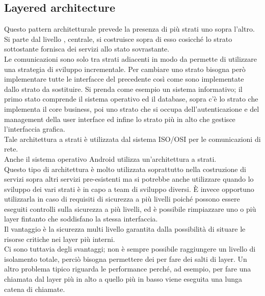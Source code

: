 \subsection{Layered architecture}
Questo pattern architetturale prevede la presenza di più strati uno sopra l'altro.\\
Si parte dal livello , centrale, si costruisce sopra di esso cosicché lo strato sottostante fornisca dei servizi allo stato sovrastante.\\
Le comunicazioni sono solo tra strati adiacenti in modo da permette di utilizzare una strategia di sviluppo incrementale.
Per cambiare uno strato bisogna però implementare tutte le interfacce del precedente così come sono implementate dallo strato da sostituire.
Si prenda come esempio un sistema informativo; il primo stato comprende il sistema operativo ed il database, sopra c'è lo strato che implementa il core business, poi uno strato che si occupa dell'autenticazione e del management della user interface ed infine lo strato più in alto che gestisce l'interfaccia grafica.\\
Tale architettura a strati è utilizzata dal sistema ISO/OSI per le comunicazioni di rete.\\
Anche il sistema operativo Android utilizza un'architettura a strati.\\
Questo tipo di architettura è molto utilizzata soprattutto nella costruzione di servizi sopra altri servizi pre-esistenti ma si potrebbe anche utilizzare quando lo sviluppo dei vari strati è in capo a team di sviluppo diversi.
È invece opportuno utilizzarla in caso di requisiti di sicurezza a più livelli poiché possono essere eseguiti controlli sulla sicurezza a più livelli, ed è possibile rimpiazzare uno o più layer fintanto che soddisfano la stessa interfaccia.\\
Il vantaggio è la sicurezza multi livello garantita dalla possibilità di situare le risorse critiche nei layer più interni.\\
Ci sono tuttavia degli svantaggi; non è sempre possibile raggiungere un livello di isolamento totale, perciò bisogna permettere dei  per fare dei salti di layer.
Un altro problema tipico riguarda le performance perché, ad esempio, per fare una chiamata dal layer più in alto a quello più in basso viene eseguita una lunga catena di chiamate.

